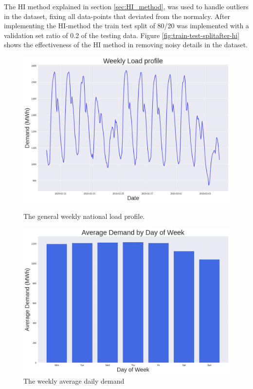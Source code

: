  The HI method explained in section \ref{sec:HI_method}, was used to handle outliers in the dataset, fixing all data-points that deviated from the normalcy.  After implementing the HI-method the train test split of 80/20 was implemented with a validation set ratio of 0.2 of the testing data. Figure \ref{fig:train-test-splitafter-hi} shows the effectiveness of the HI method in removing noisy details in the dataset.

 \begin{figure}[h]
  	\centering
  	\begin{minipage}[b]{0.45\linewidth}
  		\centering
  		\includegraphics[width=\linewidth]{Chapters/images/results/weekly_load_profile.png}
  		\caption{The general weekly national load profile.}
  		\label{fig:weeklyloadprofile}
  	\end{minipage}
  	\hfill
  	\begin{minipage}[b]{0.45\linewidth}
  		\centering
  		\includegraphics[width=\linewidth]{Chapters/images/results/average_daily_demand.png}
  		\caption{The weekly average daily demand }
  		\label{fig:averagedailydemand}
  	\end{minipage}
  \end{figure}
  
